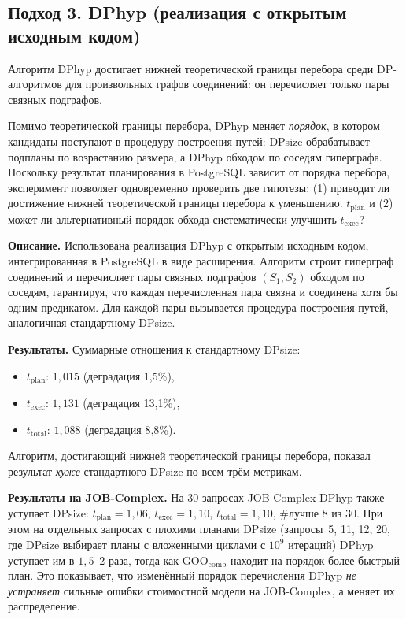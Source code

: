 \subsection{Подход 3. DPhyp (реализация с открытым исходным кодом)}

Алгоритм DPhyp \cite{MoeNeu} достигает нижней теоретической границы перебора
среди DP-алгоритмов для произвольных графов соединений:
он перечисляет только пары связных подграфов.
\par

Помимо теоретической границы перебора, DPhyp меняет \emph{порядок},
в котором кандидаты поступают в процедуру построения путей:
DPsize обрабатывает подпланы по возрастанию размера, а DPhyp обходом
по соседям гиперграфа.
Поскольку результат планирования в PostgreSQL зависит от порядка перебора,
эксперимент позволяет одновременно проверить две гипотезы:
(1) приводит ли достижение нижней теоретической границы перебора
к уменьшению. $t_{\mathrm{plan}}$ и (2) может ли альтернативный порядок обхода
систематически улучшить $t_{\mathrm{exec}}$?
\par

\textbf{Описание.}
Использована реализация DPhyp с открытым исходным кодом,
интегрированная в PostgreSQL в виде расширения.
Алгоритм строит гиперграф соединений и перечисляет пары
связных подграфов $(S_1, S_2)$ обходом по соседям, гарантируя,
что каждая перечисленная пара связна и соединена хотя бы одним
предикатом. Для каждой пары вызывается процедура построения путей,
аналогичная стандартному DPsize.
\par

\textbf{Результаты.}
Суммарные отношения к стандартному DPsize:
\begin{itemize}
    \item $t_{\mathrm{plan}}$: $1{,}015$ (деградация 1{,}5\%),
    \item $t_{\mathrm{exec}}$: $1{,}131$ (деградация 13{,}1\%),
    \item $t_{\mathrm{total}}$: $1{,}088$ (деградация 8{,}8\%).
\end{itemize}
Алгоритм, достигающий нижней теоретической границы перебора,
показал результат \emph{хуже} стандартного DPsize по всем трём метрикам.
\par

\textbf{Результаты на JOB-Complex.}
На 30 запросах JOB-Complex DPhyp также уступает DPsize:
$t_{\mathrm{plan}} = 1{,}06$, $t_{\mathrm{exec}} = 1{,}10$,
$t_{\mathrm{total}} = 1{,}10$, \#лучше 8 из 30.
При этом на отдельных запросах с плохими планами DPsize
(запросы~5, 11, 12, 20, где DPsize выбирает планы с вложенными циклами с $10^9$ итераций)
DPhyp уступает им в $1{,}5$--2 раза, тогда как $\mathrm{GOO_{comb}}$
находит на порядок более быстрый план.
Это показывает, что изменённый порядок перечисления DPhyp \emph{не устраняет}
сильные ошибки стоимостной модели на JOB-Complex, а меняет их распределение.
\par

